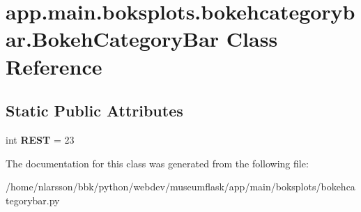 \hypertarget{classapp_1_1main_1_1boksplots_1_1bokehcategorybar_1_1BokehCategoryBar}{}\section{app.\+main.\+boksplots.\+bokehcategorybar.\+Bokeh\+Category\+Bar Class Reference}
\label{classapp_1_1main_1_1boksplots_1_1bokehcategorybar_1_1BokehCategoryBar}
\subsection*{Static Public Attributes}
\begin{DoxyCompactItemize}
\item 
\mbox{\label{classapp_1_1main_1_1boksplots_1_1bokehcategorybar_1_1BokehCategoryBar_a2cf0f10f86f61e7dd66b1d78f6b209e2}} 
int {\bfseries R\+E\+ST} = 23
\end{DoxyCompactItemize}


The documentation for this class was generated from the following file\+:\begin{DoxyCompactItemize}
\item 
/home/nlarsson/bbk/python/webdev/museumflask/app/main/boksplots/bokehcategorybar.\+py\end{DoxyCompactItemize}
